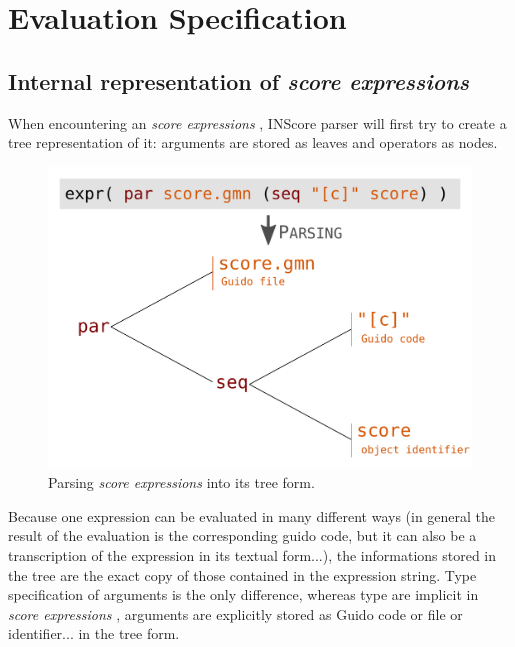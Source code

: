 \documentclass{article}
\newcommand{\sExpr}{\emph{score expressions} }
\begin{document}
\section{Evaluation Specification}


\subsection{Internal representation of \sExpr}

When encountering an \sExpr, INScore parser will first try to create a tree representation of it: arguments are stored as leaves and operators as nodes.

\begin{figure}[th]
\centering
\includegraphics[width=0.9\columnwidth]{imgs/exprParse}
\caption{Parsing \sExpr into its tree form.
\label{fig:example}}
\end{figure}

Because one expression can be evaluated in many different ways (in general the result of the evaluation is the corresponding guido code, but it can also be a transcription of the expression in its textual form...), the informations stored in the tree are the exact copy of those contained in the expression string. Type specification of arguments is the only difference, whereas type are implicit in \sExpr, arguments are explicitly stored as Guido code or file or identifier... in the tree form. 
\end{document}
